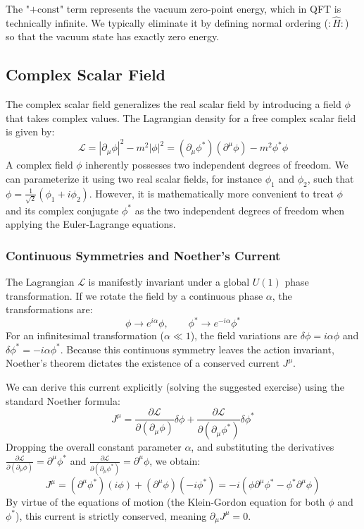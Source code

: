 \begin{remark}
    The "$+\text{const}$" term represents the vacuum zero-point energy, which in QFT is technically infinite. We typically eliminate it by defining normal ordering ($:\hat{H}:$) so that the vacuum state has exactly zero energy.
\end{remark}

\subsection{Complex Scalar Field}

The complex scalar field generalizes the real scalar field by introducing a field \(\phi\) that takes complex values. The Lagrangian density for a free complex scalar field is given by:
\[
    \mathcal{L} = |\partial_\mu \phi|^2 - m^2 |\phi|^2 = (\partial_\mu \phi^*)(\partial^\mu \phi) - m^2 \phi^* \phi
\]
A complex field \(\phi\) inherently possesses two independent degrees of freedom. We can parameterize it using two real scalar fields, for instance \(\phi_1\) and \(\phi_2\), such that \(\phi = \frac{1}{\sqrt{2}}(\phi_1 + i\phi_2)\). However, it is mathematically more convenient to treat \(\phi\) and its complex conjugate \(\phi^*\) as the two independent degrees of freedom when applying the Euler-Lagrange equations.

\subsubsection{Continuous Symmetries and Noether's Current}

The Lagrangian \(\mathcal{L}\) is manifestly invariant under a global \(U(1)\) phase transformation. If we rotate the field by a continuous phase \(\alpha\), the transformations are:
\[
    \phi \to e^{i\alpha} \phi, \qquad \phi^* \to e^{-i\alpha} \phi^*
\]
For an infinitesimal transformation (\(\alpha \ll 1\)), the field variations are \(\delta \phi = i\alpha \phi\) and \(\delta \phi^* = -i\alpha \phi^*\). Because this continuous symmetry leaves the action invariant, Noether's theorem dictates the existence of a conserved current \(J^\mu\).

We can derive this current explicitly (solving the suggested exercise) using the standard Noether formula:
\[
    J^\mu = \frac{\partial \mathcal{L}}{\partial(\partial_\mu \phi)} \delta\phi + \frac{\partial \mathcal{L}}{\partial(\partial_\mu \phi^*)} \delta\phi^*
\]
Dropping the overall constant parameter \(\alpha\), and substituting the derivatives \(\frac{\partial \mathcal{L}}{\partial(\partial_\mu \phi)} = \partial^\mu \phi^*\) and \(\frac{\partial \mathcal{L}}{\partial(\partial_\mu \phi^*)} = \partial^\mu \phi\), we obtain:
\[
    J^\mu = (\partial^\mu \phi^*)(i\phi) + (\partial^\mu \phi)(-i\phi^*) = -i (\phi \partial^\mu \phi^* - \phi^* \partial^\mu \phi)
\]
By virtue of the equations of motion (the Klein-Gordon equation for both \(\phi\) and \(\phi^*\)), this current is strictly conserved, meaning \(\partial_\mu J^\mu = 0\).

